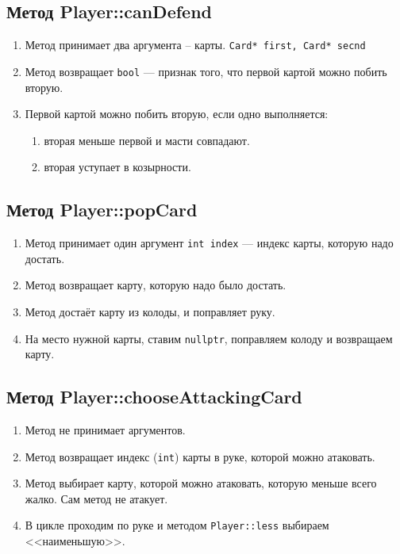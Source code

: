 \documentclass[a4paper,12pt]{article}
\begin{document}
		\subsection {Метод Player::canDefend}
			\begin{enumerate}
				\item 	Метод принимает два аргумента -- карты. \texttt{Card* first, Card* secnd}
				\item 	Метод возвращает \texttt{bool} --- признак того, что первой картой можно побить вторую.
				\item 	Первой картой можно побить вторую, если одно выполняется:
					\begin{enumerate}
						\item 	вторая меньше первой и масти совпадают.
						\item 	вторая уступает в козырности.
					\end{enumerate}
			\end{enumerate}
		\subsection {Метод Player::popCard}
			\begin{enumerate}
				\item  	Метод принимает один аргумент \texttt{int index} --- индекс карты, которую надо достать.
				\item 	Метод возвращает карту, которую надо было достать.
				\item 	Метод достаёт карту из колоды, и поправляет руку.
				\item 	На место нужной карты, ставим \texttt{nullptr}, поправляем колоду и возвращаем карту.
			\end{enumerate}
		\subsection {Метод Player::chooseAttackingCard}
			\begin{enumerate}
				\item 	Метод не принимает аргументов.
				\item 	Метод возвращает индекс (\texttt{int}) карты в руке, которой можно атаковать.
				\item 	Метод выбирает карту, которой можно атаковать, которую меньше всего жалко.
						Сам метод не атакует.
				\item 	В цикле проходим по руке и методом \texttt{Player::less} выбираем <<наименьшую>>.
			\end{enumerate}
\end{document}
